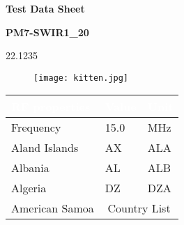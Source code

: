 \documentclass{article}%
\begin{document}
%
\tiny%
%
\vspace{25mm}%
\begin{spacing}{1.5}%
\begin{center} {\Large \textbf{Test Data Sheet} \par}%
\end{center}%
\end{spacing}%
\begin{center} {\large\textbf{PM7-SWIR1\_20} \par} \end{center}%
\begin{center} {\normalsize 22.1235 \par} \end{center}%
\begin{figure}[h]%
\texttt{[image: kitten.jpg]}%
\centering%
\end{figure}%
\begin{table}[h]%
\centering%
\begin{tabular}{ |p{10cm}|p{3cm}|p{1.5cm}|  }%
\hline%
\rowcolor[HTML]{153c4a}%
\textcolor{white}{RF properties}  & \hfil \textcolor{white}{Value} & \hfil \textcolor{white}{Unit}  \\%
\hline%
Frequency & \hfil 15.0 & \hfil MHz \\%
\hline%
Aland Islands & \hfil AX   & \hfil ALA \\%
\hline%
Albania & \hfil AL & \hfil ALB \\%
\hline%
Algeria    & \hfil DZ & \hfil DZA \\%
\hline%
American Samoa & \multicolumn{2}{|c|}{Country List} \\%
\hline%
\end{tabular}%
\end{table}%
%
%
%
%
\end{document}

